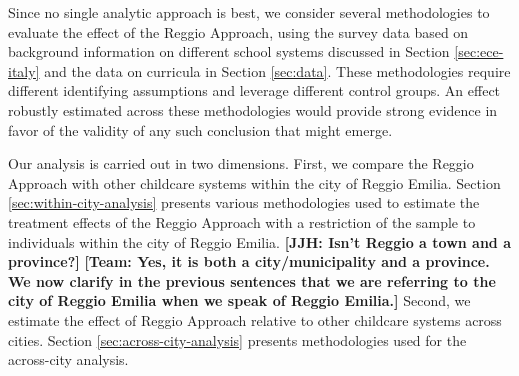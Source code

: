 Since no single analytic approach is best, we consider several methodologies to evaluate the effect of the Reggio Approach, using the survey data based on background information on different school systems discussed in Section \ref{sec:ece-italy} and the data on curricula in Section \ref{sec:data}. These methodologies require different identifying assumptions and leverage different control groups. An effect robustly estimated across these methodologies would provide strong evidence in favor of the validity of any such conclusion that might emerge.

Our analysis is carried out in two dimensions. First, we compare the Reggio Approach with other childcare systems within the city of Reggio Emilia. Section \ref{sec:within-city-analysis} presents various methodologies used to estimate the treatment effects of the Reggio Approach with a restriction of the sample to individuals within the city of Reggio Emilia. \textbf{[JJH: Isn't Reggio a town and a province?]} \textbf{[Team: Yes, it is both a city/municipality and a province. We now clarify in the previous sentences that we are referring to the city of Reggio Emilia when we speak of Reggio Emilia.]} Second, we estimate the effect of Reggio Approach relative to other childcare systems across cities. Section \ref{sec:across-city-analysis} presents methodologies used for the across-city analysis.


